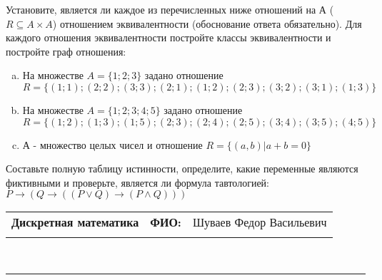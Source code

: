 \documentclass[10pt]{exam}
\newcommand{\class}{Дискретная математика}
\newcommand{\examdate}{}
\begin{document}
\begin{questions}
\question
Установите, является ли каждое из перечисленных ниже отношений на А ($R \subseteq A \times A$) отношением эквивалентности (обоснование ответа обязательно). Для каждого отношения эквивалентности постройте классы 
эквивалентности и постройте граф отношения:
\begin{enumerate} [a)]\setcounter{enumi}{0}
\item На множестве $A = \{1; 2; 3\}$ задано отношение $R = \{(1; 1); (2; 2); (3; 3); (2; 1); (1; 2); (2; 3); (3; 2); (3; 1); (1; 3)\}$
\item На множестве $A = \{1; 2; 3; 4; 5\}$ задано отношение $R = \{(1; 2); (1; 3); (1; 5); (2; 3); (2; 4); (2; 5); (3; 4); (3; 5); (4; 5)\}$
\item А - множество целых чисел и отношение $R = \{(a,b)|a + b = 0\}$
\end{enumerate}\question Составьте полную таблицу истинности, определите, какие переменные являются фиктивными и проверьте, является ли формула тавтологией:
$ P \rightarrow (Q \rightarrow ((P \lor Q) \rightarrow (P \land Q)))$

\end{questions}
\newpage
\begin{flushright}
\begin{tabular}{p{2.8in} r l}
\textbf{\class} & \textbf{ФИО:} &Шуваев Федор Васильевич
\\

\textbf{\examdate} &&\\
\end{tabular}\\
\end{flushright}
\rule[1ex]{\textwidth}{.1pt}
\end{document}
